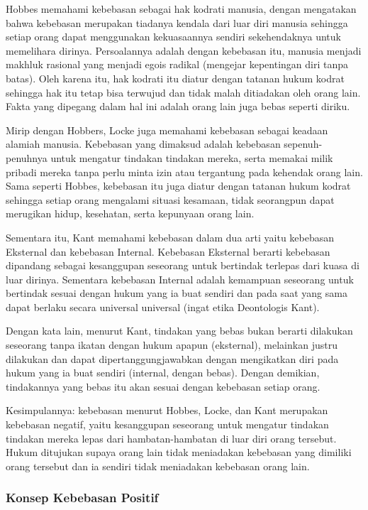 \documentclass[11pt,twoside,a5paper,openany]{memoir}
\begin{document}
Hobbes memahami kebebasan sebagai hak kodrati manusia, dengan mengatakan
bahwa kebebasan merupakan tiadanya kendala dari luar diri manusia
sehingga setiap orang dapat menggunakan kekuasaannya sendiri
sekehendaknya untuk memelihara dirinya. Persoalannya adalah dengan
kebebasan itu, manusia menjadi makhluk rasional yang menjadi egois
radikal (mengejar kepentingan diri tanpa batas). Oleh karena itu, hak
kodrati itu diatur dengan tatanan hukum kodrat sehingga hak itu tetap
bisa terwujud dan tidak malah ditiadakan oleh orang lain. Fakta yang
dipegang dalam hal ini adalah orang lain juga bebas seperti diriku.

Mirip dengan Hobbers, Locke juga memahami kebebasan sebagai keadaan
alamiah manusia. Kebebasan yang dimaksud adalah kebebasan
sepenuh-penuhnya untuk mengatur tindakan tindakan mereka, serta memakai
milik pribadi mereka tanpa perlu minta izin atau tergantung pada
kehendak orang lain. Sama seperti Hobbes, kebebasan itu juga diatur
dengan tatanan hukum kodrat sehingga setiap orang mengalami situasi
kesamaan, tidak seorangpun dapat merugikan hidup, kesehatan, serta
kepunyaan orang lain.

Sementara itu, Kant memahami kebebasan dalam dua arti yaitu kebebasan
Eksternal dan kebebasan Internal. Kebebasan Eksternal berarti kebebasan
dipandang sebagai kesanggupan seseorang untuk bertindak terlepas dari
kuasa di luar dirinya. Sementara kebebasan Internal adalah kemampuan
seseorang untuk bertindak sesuai dengan hukum yang ia buat sendiri dan
pada saat yang sama dapat berlaku secara universal universal (ingat
etika Deontologis Kant).

Dengan kata lain, menurut Kant, tindakan yang bebas bukan berarti
dilakukan seseorang tanpa ikatan dengan hukum apapun (eksternal),
melainkan justru dilakukan dan dapat dipertanggungjawabkan dengan
mengikatkan diri pada hukum yang ia buat sendiri (internal, dengan
bebas). Dengan demikian, tindakannya yang bebas itu akan sesuai dengan
kebebasan setiap orang.

Kesimpulannya: kebebasan menurut Hobbes, Locke, dan Kant merupakan
kebebasan negatif, yaitu kesanggupan seseorang untuk mengatur tindakan
tindakan mereka lepas dari hambatan-hambatan di luar diri orang
tersebut. Hukum ditujukan supaya orang lain tidak meniadakan kebebasan
yang dimiliki orang tersebut dan ia sendiri tidak meniadakan kebebasan
orang lain.

\hypertarget{konsep-kebebasan-positif}{%
\subsubsection{Konsep Kebebasan
Positif}\label{konsep-kebebasan-positif}}
\end{document}
